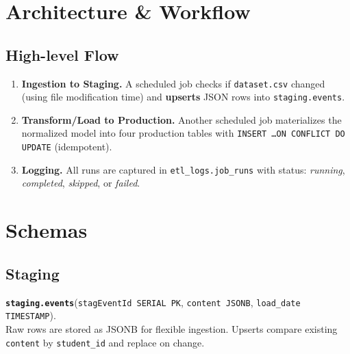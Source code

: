 \documentclass[11pt]{article}
\begin{document}
\section{Architecture \& Workflow}
\subsection*{High-level Flow}
\begin{enumerate}[leftmargin=1.5em]
  \item \textbf{Ingestion to Staging.} A scheduled job checks if \texttt{dataset.csv} changed (using file modification time) and \textbf{upserts} JSON rows into \texttt{staging.events}.
  \item \textbf{Transform/Load to Production.} Another scheduled job materializes the normalized model into four production tables with \texttt{INSERT \ldots ON CONFLICT DO UPDATE} (idempotent).
  \item \textbf{Logging.} All runs are captured in \texttt{etl\_logs.job\_runs} with status: \emph{running}, \emph{completed}, \emph{skipped}, or \emph{failed}.
\end{enumerate}

\begin{center}
\end{center}

\section{Schemas}
\subsection*{Staging}
\textbf{\texttt{staging.events}}(\texttt{stagEventId SERIAL PK}, \texttt{content JSONB}, \texttt{load\_date TIMESTAMP}).\\
Raw rows are stored as JSONB for flexible ingestion. Upserts compare existing \texttt{content} by \texttt{student\_id} and replace on change.
\end{document}
